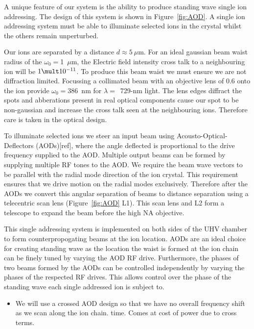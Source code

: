 \documentclass[12pt]{iopart}
\begin{document}
A unique feature of our system is the ability to produce standing wave
single ion addressing. The design of this system is shown in
Figure~\ref{fig:AOD}.  A single ion addressing system must be able to
illuminate selected ions in the crystal whilst the others remain
unperturbed.

Our ions are separated by a distance $d\approx 5~\mu$m. For an ideal
gaussian beam waist radius of the $\omega_0 = $1~$\mu$m, the Electric
field intensity cross talk to a neighbouring ion will be $1\mult
10^{-11}$. To produce this beam waist we must ensure we are not
diffraction limited.  Focussing a collimated beam with an objective
lens of 0.6 onto the ion provide $\omega_0 = 386$~nm for
$\lambda=$~729-nm light. The lens edges diffract the spots and
abberations present in real optical components cause our spot to be
non-gaussian and increase the cross talk seen at the neighbouring
ions. Therefore care is taken in the optical design.

To illuminate selected ions we steer an input beam using
Acousto-Optical-Deflectors (AODs)[ref], where the angle deflected is
proportional to the drive frequency supplied to the AOD. Multiple
output beams can be formed by supplying multiple RF tones to the AOD.
We require the beam wave vectors to be
parallel with the radial mode direction of the ion crystal. This
requirement ensures that we drive motion on the radial modes
exclusively. Therefore after the AODs we convert this angular
separation of beams to distance separation using a telecentric scan
lens (Figure~\ref{fig:AOD} L1).
This scan lens and L2 form a telescope to expand the beam before the
high NA objective.

This single addressing system is implemented on both sides of the UHV
chamber to form counterpropogating beams at the ion location. AODs are
an ideal choice for creating standing wave as the location the waist
is formed at the ion chain can be finely tuned by varying the AOD RF
drive. Furthermore, the phases of two beams formed by the AODs can be
controlled independently by varying the phases of the respected RF
drives. This allows control over the phase of the standing wave each
single addressed ion is subject to.



\begin{itemize}
There is minimal path length difference compared to waveguide which is
ideal as we can stabilise at some central frequency and should be
stable at all ion locations.
\item We will use a crossed AOD design so that we have no overall frequency
shift as we scan along the ion chain.
time. Comes at cost of power due to cross terms.
\end{itemize}
\end{document}
